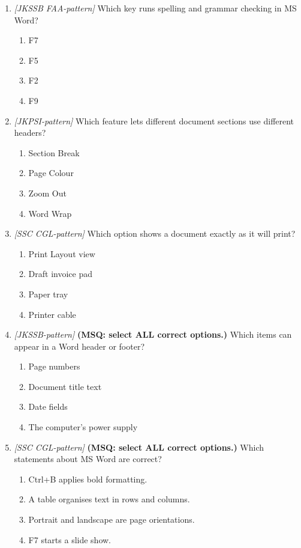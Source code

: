 \begin{enumerate}[label=\textbf{Q\arabic*.}, leftmargin=*]
\item \textit{[JKSSB FAA-pattern]} Which key runs spelling and grammar checking in MS Word?
  \begin{enumerate}[label=\Alph*.]
    \item F7
    \item F5
    \item F2
    \item F9
  \end{enumerate}
\item \textit{[JKPSI-pattern]} Which feature lets different document sections use different headers?
  \begin{enumerate}[label=\Alph*.]
    \item Section Break
    \item Page Colour
    \item Zoom Out
    \item Word Wrap
  \end{enumerate}
\item \textit{[SSC CGL-pattern]} Which option shows a document exactly as it will print?
  \begin{enumerate}[label=\Alph*.]
    \item Print Layout view
    \item Draft invoice pad
    \item Paper tray
    \item Printer cable
  \end{enumerate}
\item \textit{[JKSSB-pattern]} \textbf{(MSQ: select ALL correct options.)} Which items can appear in a Word header or footer?
  \begin{enumerate}[label=\Alph*.]
    \item Page numbers
    \item Document title text
    \item Date fields
    \item The computer's power supply
  \end{enumerate}
\item \textit{[SSC CGL-pattern]} \textbf{(MSQ: select ALL correct options.)} Which statements about MS Word are correct?
  \begin{enumerate}[label=\Alph*.]
    \item Ctrl+B applies bold formatting.
    \item A table organises text in rows and columns.
    \item Portrait and landscape are page orientations.
    \item F7 starts a slide show.

\end{enumerate}
\end{enumerate}
